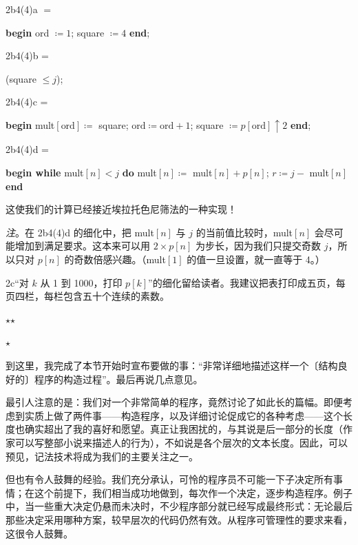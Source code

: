 \noindent
2b4(4)a $=$

\noindent
\textbf{begin} ord $\coloneq 1$; square $\coloneq 4$ \textbf{end};

\noindent
2b4(4)b =

\noindent
\quad (square $\leqslant j$);

\noindent
2b4(4)c =

\noindent
\textbf{begin} mult$[\text{ord}] \coloneq$ square; $\text{ord} \coloneq \text{ord} + 1$; square $\coloneq p[\text{ord}] \uparrow 2$ \textbf{end};

\noindent
2b4(4)d =

\noindent
\textbf{begin while} mult$[n] < j$ \textbf{do} mult$[n]\coloneq$ mult$[n] + p[n]$; $r\coloneq j -$ mult$[n]$ \textbf{end}

\noindent
这使我们的计算已经接近埃拉托色尼筛法的一种实现！

\noindent
\textit{注}。在 2b4(4)d 的细化中，把 mult$[n]$ 与 $j$ 的当前值比较时，mult$[n]$ 会尽可能增加到满足要求。这本来可以用 $2\times p[n]$ 为步长，因为我们只提交奇数 $j$，所以只对 $p[n]$ 的奇数倍感兴趣。（mult$[1]$ 的值一旦设置，就一直等于 4。）

2c“对 $k$ 从 1 到 1000，打印 $p[k]$”的细化留给读者。我建议把表打印成五页，每页四栏，每栏包含五十个连续的素数。

\vspace*{-1em}
\begin{center}
	$\star$\quad\quad  $\star$\\
	\nopagebreak
	
	\vspace*{-.5em}
	$\star$
\end{center}
\vspace*{-1em}

到这里，我完成了本节开始时宣布要做的事：“非常详细地描述这样一个〔结构良好的〕程序的构造过程”。最后再说几点意见。

最引人注意的是：我们对一个非常简单的程序，竟然讨论了如此长的篇幅。即便考虑到实质上做了两件事——构造程序，以及详细讨论促成它的各种考虑——这个长度也确实超出了我的喜好和愿望。真正让我困扰的，与其说是后一部分的长度（作家可以写整部小说来描述人的行为），不如说是各个层次的文本长度。因此，可以预见，记法技术将成为我们的主要关注之一。

但也有令人鼓舞的经验。我们充分承认，可怜的程序员不可能一下子决定所有事情；在这个前提下，我们相当成功地做到，每次作一个决定，逐步构造程序。例子中，当一些重大决定仍悬而未决时，不少程序部分就已经写成最终形式：无论最后那些决定采用哪种方案，较早层次的代码仍然有效。从程序可管理性的要求来看，这很令人鼓舞。

